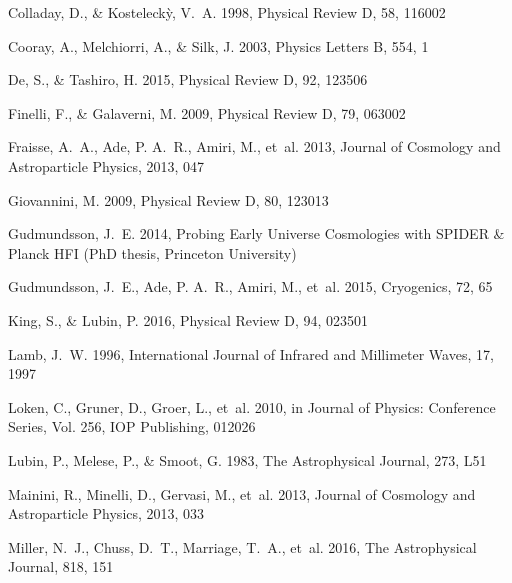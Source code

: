 \documentclass[twocolumn]{aastex61}
\begin{document}
\begin{thebibliography}{}
Colladay, D., \& Kosteleck{\`y}, V.~A. 1998, Physical Review D, 58, 116002

Cooray, A., Melchiorri, A., \& Silk, J. 2003, Physics Letters B, 554, 1

De, S., \& Tashiro, H. 2015, Physical Review D, 92, 123506

Finelli, F., \& Galaverni, M. 2009, Physical Review D, 79, 063002

Fraisse, A.~A., Ade, P. A.~R., Amiri, M., {et~al.} 2013, Journal of Cosmology
  and Astroparticle Physics, 2013, 047

Giovannini, M. 2009, Physical Review D, 80, 123013

Gudmundsson, J.~E. 2014, Probing Early Universe Cosmologies with {SPIDER} \&
  Planck {HFI} (PhD thesis, Princeton University)

Gudmundsson, J.~E., Ade, P. A.~R., Amiri, M., {et~al.} 2015, Cryogenics, 72, 65

King, S., \& Lubin, P. 2016, Physical Review D, 94, 023501

Lamb, J.~W. 1996, International Journal of Infrared and Millimeter Waves, 17,
  1997

Loken, C., Gruner, D., Groer, L., {et~al.} 2010, in Journal of Physics:
  Conference Series, Vol. 256, IOP Publishing, 012026

Lubin, P., Melese, P., \& Smoot, G. 1983, The Astrophysical Journal, 273, L51

Mainini, R., Minelli, D., Gervasi, M., {et~al.} 2013, Journal of Cosmology and
  Astroparticle Physics, 2013, 033

Miller, N.~J., Chuss, D.~T., Marriage, T.~A., {et~al.} 2016, The Astrophysical
  Journal, 818, 151


\end{thebibliography}
\end{document}
